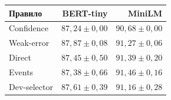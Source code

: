 \begin{tabular}{lrr}
\toprule
Правило & BERT-tiny & MiniLM \\
\midrule
Confidence & $87{,}24\pm0{,}00$ & $90{,}68\pm0{,}00$ \\
Weak-error & $87{,}87\pm0{,}08$ & $91{,}27\pm0{,}06$ \\
Direct & $87{,}45\pm0{,}50$ & $91{,}39\pm0{,}20$ \\
Events & $87{,}38\pm0{,}66$ & $91{,}46\pm0{,}16$ \\
Dev-selector & $87{,}61\pm0{,}39$ & $91{,}16\pm0{,}28$ \\
\bottomrule
\end{tabular}
